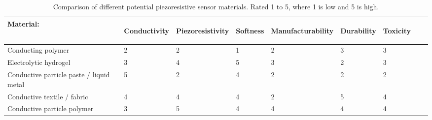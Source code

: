 \begin{table}[H]
	\centering
	\caption{Comparison of different potential piezoresistive sensor materials. Rated 1 to 5, where 1 is low and 5 is high.}
	\label{tab:comparing-piezo-r-materials}
	\vspace{3cm}
	\begin{tabular}{|p{5cm}|p{1cm}|p{1cm}|p{1cm}|p{1cm}|p{1cm}|p{1cm}|p{1cm}|p{1cm}|}
		\multicolumn{1}{l}{\textbf{Material:}} & \multicolumn{1}{c}{\begin{rotate}{60} \hspace{0.1cm}\vspace{-2cm} \textbf{Conductivity} \end{rotate}} & 
		\multicolumn{1}{c}{\begin{rotate}{60} \hspace{0.2cm}\vspace{-2cm} \textbf{Piezoresistivity} \end{rotate}} & 
		\multicolumn{1}{c}{\begin{rotate}{60} \hspace{0.2cm}\vspace{-2cm} \textbf{Softness} \end{rotate}} & 
		\multicolumn{1}{c}{\begin{rotate}{60} \hspace{0.2cm}\vspace{-2cm} \textbf{Manufacturability} \end{rotate}} & 
		\multicolumn{1}{c}{\begin{rotate}{60} \hspace{0.2cm}\vspace{-2cm} \textbf{Durability} \end{rotate}} & 
		\multicolumn{1}{c}{\begin{rotate}{60} \hspace{0.2cm}\vspace{-2cm} \textbf{Toxicity} \end{rotate}} \\ \hline
		
		Conducting polymer \cite{Guo2018,Hazelton2023,Bhattacharjee2020,Mukherjee2023} & 2 & 2 & 1 & 2 & 3 & 3 \\ \hline
		Electrolytic hydrogel \cite{Guo2018,Shen2022,Li2020a,Li2020b,Lu2014,Wang2018} & 3 & 4 & 5 & 3 & 2 & 3   \\ \hline
		Conductive particle paste / liquid metal \cite{Chen2020a,Park2010,Jung2015} & 5 & 2 & 4 & 2 & 2 & 2 \\ \hline
		Conductive textile / fabric \cite{Jeong2020a,Yao2012,Rashid2022} & 4 & 4 & 4 & 2 & 5 & 4  \\ \hline
		Conductive particle polymer \cite{Princy1998,Spahr2017,Duan2014,Buketov2020} & 3 & 5 & 4 & 4 & 4 & 4 \\ \hline
	\end{tabular}
\end{table}

